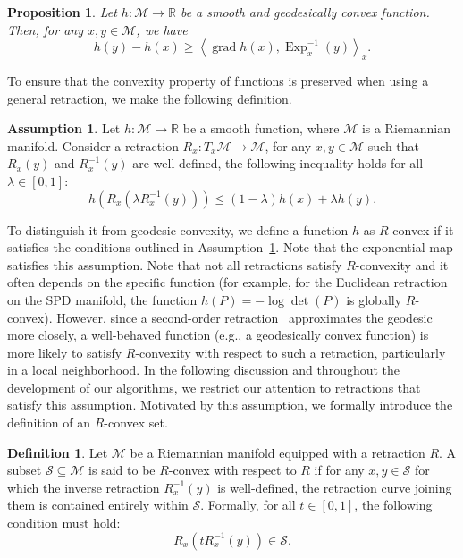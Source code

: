 \documentclass[pdflatex,sn-mathphys-num]{sn-jnl}%
\newtheorem{proposition}[theorem]{Proposition} %
\theoremstyle{definition} %
\newtheorem{definition}{Definition}[section] %
\newtheorem{assumption}{Assumption} %
\theoremstyle{remark} %
\begin{document}
\begin{proposition}\cite{weber_riemannian_2023}
    Let $h \colon \mathcal{M} \rightarrow \mathbb{R}$ be a smooth and geodesically convex function. Then, for any $x, y \in \mathcal{M}$,
    we have
    $$
    h(y)-h(x) \geq\left\langle\operatorname{grad} h(x), \operatorname{Exp}_x^{-1}(y)\right\rangle_x .
    $$
\end{proposition}
To ensure that the convexity property of functions is preserved when using a general retraction, we make the following definition.
\begin{assumption}\label{assumption convex}
     Let \( h: \mathcal{M} \to \mathbb{R} \) be a smooth function, where \(\mathcal{M}\) is a Riemannian manifold. Consider a retraction \( R_x: T_x \mathcal{M} \to \mathcal{M} \), for any \( x, y \in \mathcal{M} \) such that \( R_x(y) \) and \( R_x^{-1}(y) \) are well-defined, the following inequality holds for all \( \lambda \in [0,1] \):
    \[
    h(R_x(\lambda R_x^{-1}(y))) \leq (1-\lambda) h(x) + \lambda h(y).
    \] 
\end{assumption}   
To distinguish it from geodesic convexity, we define a function $h$ as $R$-convex if it satisfies the conditions outlined in Assumption~\ref{assumption convex}.
Note that the exponential map satisfies this assumption. 
Note that not all retractions satisfy $R$-convexity and it often depends on the specific function (for example, for the Euclidean retraction on the SPD manifold, the function $h(P) = -\log \det(P)$ is globally $R$-convex). However, since a second-order retraction~\cite[Definition 5.42]{Boumal_2023}
approximates the geodesic more closely, a well-behaved function (e.g., a geodesically convex function) is more likely to satisfy $R$-convexity with respect to such a retraction, particularly in a local neighborhood. 
In the following discussion and throughout the development of our algorithms, we restrict our attention to retractions that satisfy this assumption.
Motivated by this assumption, we formally introduce the definition of an $R$-convex set.
\begin{definition}
Let $\mathcal{M}$ be a Riemannian manifold equipped with a retraction $R$. A subset $\mathcal{S} \subseteq \mathcal{M}$ is said to be $R$-convex with respect to $R$ if for any $x, y \in \mathcal{S}$ for which the inverse retraction $R_x^{-1}(y)$ is well-defined, the retraction curve joining them is contained entirely within $\mathcal{S}$. 
Formally, for all $t \in [0, 1]$, the following condition must hold:
\[
R_x\left(t R_x^{-1}(y)\right) \in \mathcal{S}.
\]
\end{definition}
\end{document}
